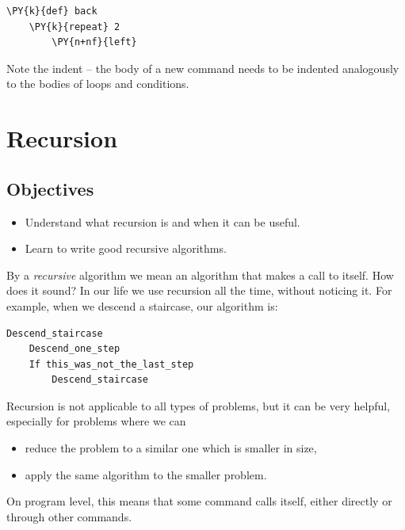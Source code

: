 \begin{bbox}
\begin{Verbatim}[commandchars=\\\{\}]
\PY{k}{def} back
    \PY{k}{repeat} 2
        \PY{n+nf}{left}
\end{Verbatim}
\end{bbox}
\vspace{6mm}

\noindent
Note the indent -- the body of a new command needs to be indented 
analogously to the bodies of loops and conditions.


\section{Recursion} \label{sec:recursion}

\subsection{Objectives} 
 
\begin{itemize}
\item Understand what recursion is and when it can be useful.
\item Learn to write good recursive algorithms.
\end{itemize}
By a {\em recursive} algorithm we mean an algorithm that makes a call to itself. How does it sound?
In our life we use recursion all the time, without noticing it. For example, when we descend 
a staircase, our algorithm is:\\

\begin{bbox}
\begin{Verbatim}[commandchars=\\\{\}]
Descend_staircase
    Descend_one_step
    If this_was_not_the_last_step
        Descend_staircase
\end{Verbatim}
\end{bbox}
\vspace{6mm}

\noindent
Recursion is not applicable to all types of problems, but it can be very 
helpful, especially for problems where we can
\begin{itemize}
\item reduce the problem to a similar one which is smaller in size, 
\item apply the same algorithm to the smaller problem. 
\end{itemize}
On program level, this means that some command calls itself, either 
directly or through other commands.

